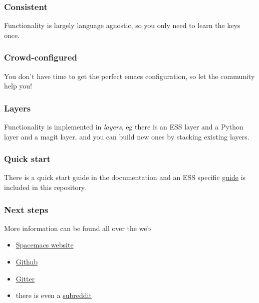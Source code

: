 \documentclass[presentation]{beamer}
\begin{document}
  \begin{frame}
    \frametitle{Consistent}
    Functionality is largely language agnostic, so you only need to learn the
    keys once.
  \end{frame}


  \begin{frame}
    \frametitle{Crowd-configured}
    You don't have time to get the perfect emacs configuration, so let the
    community help you!
  \end{frame}


  \begin{frame}
    \frametitle{Layers}
    Functionality is implemented in \emph{layers}, eg there is an ESS layer and
    a Python layer and a magit layer, and you can build new ones by stacking
    existing layers.
  \end{frame}

  
  \begin{frame}
    \frametitle{Quick start}
    There is a quick start guide in the documentation and an ESS specific
    \href{https://github.com/ess-intro/presentation-ess-from-spacemacs/tree/main/presentation}{guide}
    is included in this repository.
  \end{frame}

  \begin{frame}
    \frametitle{Next steps}
    More information can be found all over the web
    \begin{itemize}
    \item \href{https://www.spacemacs.org/}{Spacemacs website}
    \item \href{https://github.com/syl20bnr/spacemacs}{Github}
    \item \href{https://gitter.im/syl20bnr/spacemacs}{Gitter}
    \item there is even a \href{https://www.reddit.com/r/spacemacs/}{subreddit}
    \end{itemize}
  \end{frame}
  
\end{document}
